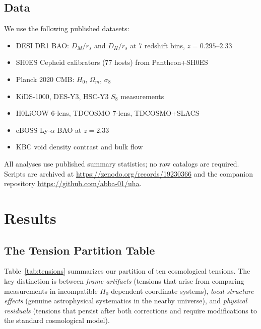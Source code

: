 \documentclass[twocolumn]{aastex631}
\begin{document}
\subsection{Data}

We use the following published datasets:
\begin{itemize}
  \item DESI DR1 BAO: $D_M/r_s$ and $D_H/r_s$ at 7 redshift bins,
        $z = 0.295$--$2.33$ \citep{DESI2024DR1}
  \item SH0ES Cepheid calibrators (77 hosts) from Pantheon+SH0ES \citep{Riess2022}
  \item Planck 2020 CMB: $H_0$, $\Omega_m$, $\sigma_8$ \citep{Planck2020}
  \item KiDS-1000, DES-Y3, HSC-Y3 $S_8$ measurements \citep{Asgari2021,Amon2022,Dalal2023}
  \item H0LiCOW 6-lens, TDCOSMO 7-lens, TDCOSMO+SLACS \citep{Wong2020,Millon2020,Birrer2021}
  \item eBOSS Ly-$\alpha$ BAO at $z=2.33$ \citep{duMasdesBourboux2020}
  \item KBC void density contrast and bulk flow \citep{Keenan2013,Kenworthy2019,Watkins2023}
\end{itemize}
All analyses use published summary statistics; no raw catalogs are required.
Scripts are archived at \url{https://zenodo.org/records/19230366} and the
companion repository \url{https://github.com/abba-01/uha}.


\section{Results}

\subsection{The Tension Partition Table}

Table~\ref{tab:tensions} summarizes our partition of ten cosmological tensions.
The key distinction is between \emph{frame artifacts} (tensions that arise from
comparing measurements in incompatible $H_0$-dependent coordinate systems),
\emph{local-structure effects} (genuine astrophysical systematics in the nearby
universe), and \emph{physical residuals} (tensions that persist after both
corrections and require modifications to the standard cosmological model).
\end{document}
